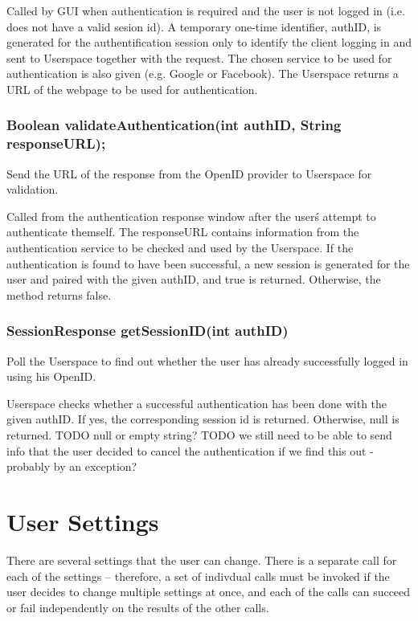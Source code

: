 Called by GUI when authentication is required and the user is not logged in (i.e. does not have a valid sesion id).
A temporary one-time identifier, authID, is generated for the authentification session only to identify the client logging in and sent to Userspace together with the request.
The chosen service to be used for authentication is also given (e.g. Google or Facebook).
The Userspace returns a URL of the webpage to be used for authentication.

\subsubsection{Boolean validateAuthentication(int authID, String responseURL);}
Send the URL of the response from the OpenID provider to Userspace for validation.

Called from the authentication response window after the user\'s attempt to authenticate themself.
The responseURL contains information from the authentication service to be checked and used by the Userspace.
If the authentication is found to have been successful, a new session is generated for the user and paired with the given authID, and true is returned.
Otherwise, the method returns false.

\subsubsection{SessionResponse getSessionID(int authID)}
Poll the Userspace to find out whether the user has already successfully logged in using his OpenID.

Userspace checks whether a successful authentication has been done with the given authID.
If yes, the corresponding session id is returned.
Otherwise, null is returned.
TODO null or empty string?
TODO we still need to be able to send info that the user decided to cancel the authentication if we find this out - probably by an exception?

\section{User Settings}

There are several settings that the user can change. There is a separate call for each of the settings -- therefore, a set of indivdual calls must be invoked if the user decides to change multiple settings at once, and each of the calls can succeed or fail independently on the results of the other calls.

